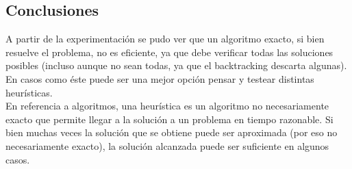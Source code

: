 \subsection{Conclusiones}

A partir de la experimentaci\'on se pudo ver que un algoritmo exacto, si bien resuelve el problema, no es eficiente, ya que debe verificar todas las soluciones posibles (incluso aunque no sean todas, ya que el backtracking descarta algunas).\\
En casos como \'este puede ser una mejor opci\'on pensar y testear distintas heur\'isticas.\\

En referencia a algoritmos, una heur\'istica es un algoritmo no necesariamente exacto que permite llegar a la soluci\'on a un problema en tiempo razonable. Si bien muchas veces la soluci\'on que se obtiene puede ser aproximada (por eso no necesariamente exacto), la soluci\'on alcanzada puede ser suficiente en algunos casos.\\